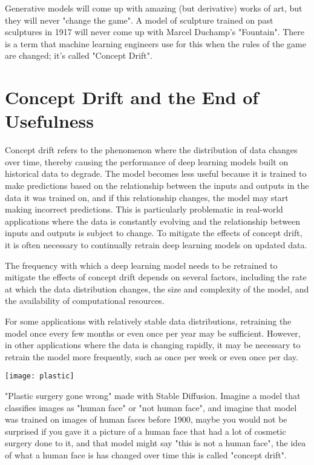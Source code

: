 Generative models will come up with amazing (but derivative) works of art, but they will never "change the game". A model of sculpture trained on past sculptures in 1917 will never come up with Marcel Duchamp's "Fountain". There is a term that machine learning engineers use for this when the rules of the game are changed; it's called "Concept Drift".

\section{Concept Drift and the End of Usefulness}

Concept drift refers to the phenomenon where the distribution of data changes over time, thereby causing the performance of deep learning models built on historical data to degrade. The model becomes less useful because it is trained to make predictions based on the relationship between the inputs and outputs in the data it was trained on, and if this relationship changes, the model may start making incorrect predictions. This is particularly problematic in real-world applications where the data is constantly evolving and the relationship between inputs and outputs is subject to change. To mitigate the effects of concept drift, it is often necessary to continually retrain deep learning models on updated data.

The frequency with which a deep learning model needs to be retrained to mitigate the effects of concept drift depends on several factors, including the rate at which the data distribution changes, the size and complexity of the model, and the availability of computational resources.

For some applications with relatively stable data distributions, retraining the model once every few months or even once per year may be sufficient. However, in other applications where the data is changing rapidly, it may be necessary to retrain the model more frequently, such as once per week or even once per day.

\begin{pdf}
\begin{marginfigure}[-5.5cm]
        \texttt{[image: plastic]}
        \caption{"Plastic surgery gone wrong" made with Stable Diffusion. Imagine a model that classifies images as "human face" or "not human face", and imagine that model was trained on images of human faces before 1900, maybe you would not be surprised if you gave it a picture of a human face that had a lot of cosmetic surgery done to it, and that model might say "this is not a human face", the idea of what a human face is has changed over time this is called "concept drift".}
\end{marginfigure}
\end{pdf}

